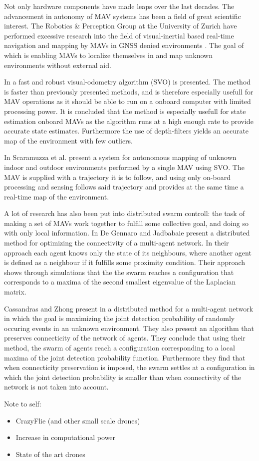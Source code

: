 Not only hardware components have made leaps over the last decades. The advancement in autonomy of MAV systems has been a field of great scientific interest.
The Robotics \& Perception Group at the University of Zurich have performed excessive research into the field of visual-inertial based real-time navigation and mapping
by MAVs in GNSS denied environments \cite{svo2, svo1}. The goal of which is enabling MAVs to localize themselves in and map unknown environments without external aid.

In \cite{svo2} a fast and robust visual-odometry algorithm (SVO) is presented. The method is faster than previously presented methods, and is therefore especially usefull 
for MAV operations as it should be able to run on a onboard computer with limited processing power. It is concluded that the method is especially usefull for state estimation onboard MAVs as the algorithm runs
at a high enough rate to provide accurate state estimates. Furthermore the use of depth-filters yields an accurate map of the environment with few outliers.

In \cite{svo1} Scaramuzza et al. present a system for autonomous mapping of unknown indoor and outdoor environments performed by a single MAV using SVO. The MAV is supplied with 
a trajectory it is to follow, and using only on-board processing and sensing follows said trajectory and provides at the same time a real-time map of the environment.

A lot of research has also been put into distributed swarm controll: the task of making a set of MAVs work together to fulfill some collective goal, and doing so 
with only local information. In \cite{connectivity_subgradient} De Gennaro and Jadbabaie present a distributed method for optimizing the connectivity of a multi-agent network.
In their approach each agent knows only the state of its neighbours, where another agent is defined as a neighbour if it fulfills some proximity condition.
Their approach shows through simulations that the the swarm reaches a configuration that corresponds to a maxima of the second smallest eigenvalue of the Laplacian matrix.

Cassandras and Zhong present in \cite{cassandras} a distributed method for a multi-agent network in which the goal is maximizing the joint detection probability of randomly occuring events in an unknown environment.
They also present an algorithm that preserves connecticity of the network of agents. They conclude that using their method, the swarm of agents reach a configuration corresponding to a 
local maxima of the joint detection probability function. Furthermore they find that when connecticity preservation is imposed, the swarm settles at a configuration in which the joint detection probability is
smaller than when connectivity of the network is not taken into account.

Note to self:
\begin{itemize}
  \item CrazyFlie (and other small scale drones)
  \item Increase in computational power
  \item State of the art drones
\end{itemize}
